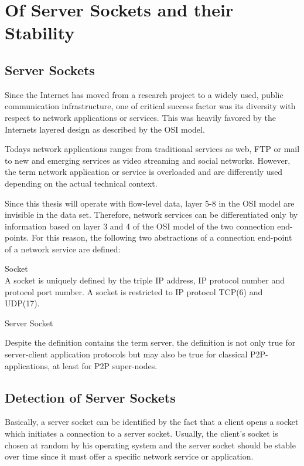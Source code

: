 \chapter{Of Server Sockets and their Stability}

\section{Server Sockets}
Since the Internet has moved from a research project to a widely used, public communication infrastructure, one of critical success factor was its diversity with respect to network applications or services. This was heavily favored by the Internets layered design as described by the OSI model. 

Todays network applications ranges from traditional services as web, FTP or mail to new and emerging services as video streaming and social networks. However, the term network application or service is overloaded and are differently used depending on the actual technical context.

Since this thesis will operate with flow-level data, layer 5-8 in the OSI model are invisible in the data set. Therefore, network services can be differentiated only by information based on layer 3 and 4 of the OSI model of the two connection end-points. For this reason, the following two abstractions of a connection end-point of a network service are defined:
\begin{defn}{Socket\\}
A socket is uniquely defined by the triple IP address, IP protocol number and protocol port number. A socket is restricted to IP protocol TCP(6) and UDP(17).
\end{defn}

\begin{defn}{Server Socket\\}
\end{defn}

Despite the definition contains the term server, the definition is not only true for server-client application protocols but may also be true for classical P2P-applications, at least for P2P super-nodes. 

\section{Detection of Server Sockets}
Basically, a server socket can be identified by the fact that a client opens a socket which initiates a connection to a server socket. Usually, the client's socket is chosen at random by his operating system and the server socket should be stable over time since it must offer a specific network service or application. 

